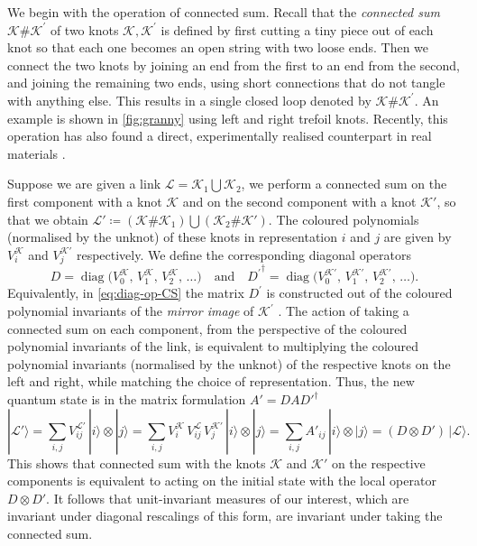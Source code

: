 \documentclass[11pt,a4paper]{article}
\begin{document}
We begin with the operation of connected sum. Recall that the \textit{connected sum} $\mathcal K \# \mathcal K^\prime$ of two knots $\mathcal K, \mathcal K^\prime$ is defined by first cutting a tiny piece out of each knot so that each one becomes an open string with two loose ends. Then we connect the two knots by joining an end from the first to an end from the second, and joining the remaining two ends, using short connections that do not tangle with anything else. This results in a single closed loop denoted by $\mathcal K \# \mathcal K^\prime$. An example is shown in \cref{fig:granny} using left and right trefoil knots. Recently, this operation has also found a direct, experimentally realised counterpart in real materials \cite{Hall:2025vortexknots}.

Suppose we are given a link $\mathscr{L} = \mathcal{K}_1 \bigcup \mathcal{K}_2$, we perform a connected sum on the first component with a knot \(\mathcal{K}\) and on the second component with a knot \(\mathcal{K}'\), so that we obtain $\mathscr{L}'\coloneq (\mathcal{K}\#\mathcal{K}_1) \bigcup (\mathcal{K}_2\#\mathcal{K}')$. The coloured polynomials (normalised by the unknot) of these knots in representation \( i \) and \( j \) are given by \( V^{\mathcal{K}}_i \) and \( V^{\mathcal{K}'}_j \) respectively. We define the corresponding diagonal operators
\begin{equation}\label{eq:diag-op-CS}
D = \operatorname{diag}\bigl(V^{\mathcal{K}}_0,\, V^{\mathcal{K}}_1,\, V^{\mathcal{K}}_2,\,\dots\bigr)
\quad\text{and}\quad
{D^\prime}^\dagger = \operatorname{diag}\bigl(V^{\mathcal{K}'}_0,\, V^{\mathcal{K}'}_1,\, V^{\mathcal{K}'}_2,\,\dots\bigr).
\end{equation}
Equivalently, in \cref{eq:diag-op-CS} the matrix ${D^\prime}$ is constructed out of the coloured polynomial invariants of the \textit{mirror image} of $\mathcal{K}^\prime$ \cite{Caputa:2024qkk}. The action of taking a connected sum on each component, from the perspective of the coloured polynomial invariants of the link, is equivalent to multiplying the coloured polynomial invariants (normalised by the unknot) of the respective knots on the left and right, while matching the choice of representation. Thus, the new quantum state is in the matrix formulation $A'=DAD'^\dagger$
\begin{equation}
|\mathscr{L}'\rangle = \sum_{i,j} V^{\mathscr{L}'}_{ij} \, |i\rangle \otimes |j\rangle  = \sum_{i,j} V^{\mathcal{K}}_i\, V^{\mathscr{L}}_{ij}\, V^{\mathcal{K}'}_j \, |i\rangle \otimes |j\rangle = \sum_{i,j} A'_{ij}\, |i\rangle \otimes |j\rangle =(D \otimes D')\, |\mathscr{L}\rangle.
\end{equation}
This shows that connected sum with the knots \(\mathcal{K}\) and \(\mathcal{K}'\) on the respective components is equivalent to acting on the initial state with the local operator \( D \otimes D' \). It follows that unit-invariant measures of our interest, which are invariant under diagonal rescalings of this form, are invariant under taking the connected sum.
\end{document}
